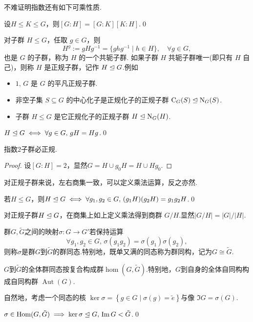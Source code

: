 不难证明指数还有如下可乘性质.
\begin{prop}
	设$H\le K\le G$，则$[G:H]=[G:K][K:H]$.\qed
\end{prop}

对子群 $H\le G$，任取 $g\in G$，则
\[
	H^g:=gHg^{-1}=\{ghg^{-1}\mid h\in H\},\quad\forall g\in G,
\]
也是 $G$ 的子群，称为 $H$ 的一个{\heiti 共轭子群}.
如果子群 $H$ 共轭子群唯一(即只有 $H$ 自己)，则称 $H$ 是{\heiti 正规子群}，记作 $H\trianglelefteq G$.例如
\begin{itemize}
	\item $1,\,G$ 是 $G$ 的平凡正规子群.
	\item 非空子集 $S\subseteq G$ 的中心化子是正规化子的正规子群 $\mathrm{C}_G(S)\trianglelefteq\mathrm{N}_G(S)$.
	\item 子群 $H\le G$ 是它正规化子的正规子群 $H\trianglelefteq\mathrm{N}_G(H)$.
\end{itemize}
\begin{lemma}
	$H\trianglelefteq G\iff\forall g\in G,\,gH=Hg$.\qed
\end{lemma}
\begin{cor}
	指数$2$子群必正规.
\end{cor}
\begin{proof}
	设$[G:H]=2$，显然$G=H\cup g_0H=H\cup Hg_0$.
\end{proof}

对正规子群来说，左右商集一致，可以定义乘法运算，反之亦然.
\begin{lemma}
	若$H\le G$，则$H\trianglelefteq G\iff\forall g_1,g_2\in G,\,(g_1H)(g_2H)=g_1g_2H$.\qed
\end{lemma}

对正规子群$H\trianglelefteq G$，在商集上如上定义乘法得到{\heiti 商群} $G/H$.显然$|G/H|=|G|/|H|$.

\begin{definition}
	群$G,\tilde{G}$之间的映射$\sigma\colon G\to G'$若保持运算
	\[
		\forall g_1,g_2\in G,\,\sigma(g_1g_2)=\sigma(g_1)\sigma(g_2),
	\]
	则称$\sigma$是群$G$到$\tilde{G}$的{\heiti 群同态}.特别地，既单又满的同态称为{\heiti 群同构}，记为$G\cong\tilde{G}$.

	$G$到$\tilde{G}$的全体群同态按复合构成群$\hom(G,\tilde{G})$.特别地，$G$到自身的全体自同构构成{\heiti 自同构群} $\operatorname*{Aut}(G)$.
\end{definition}

自然地，考虑一个同态的{\heiti 核} $\ker\sigma=\left\{g\in G\mid \sigma(g)=\tilde{e}\right\}$与{\heiti 像} $\Im G=\sigma(G)$.
\begin{prop}
	$\sigma\in\operatorname*{Hom}(G,\tilde{G})\implies\ker\sigma\trianglelefteq G,\,\operatorname*{Im} G<\tilde{G}$.\qed
\end{prop}

